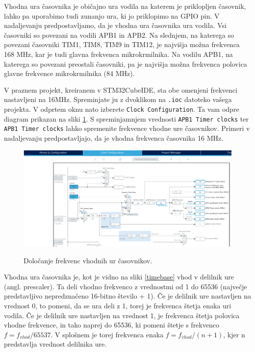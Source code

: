 \documentclass[12pt,letterpaper]{article}
\begin{document}
Vhodna ura časovnika je običajno ura vodila na katerem je priklopljen časovnik, lahko pa uporabimo tudi zunanjo ura, ki jo priklopimo na GPIO pin. V nadaljevanju predpostavljamo, da je vhodna ura časovnika ura vodila. Vsi časovniki so povezani na vodili APB1 in APB2. Na slednjem, na katerega so povezani časovniki TIM1, TIM8, TIM9 in TIM12, je najvišja možna frekvenca 168 MHz, kar je tudi glavna frekvenca mikrokrmilnika. Na vodilu APB1, na katerega so povezani preostali časovniki, pa je najvišja možna frekvenca polovica glavne frekvence mikrokrmilnika (84 MHz). 

V praznem projekt, kreiranem v STM32CubeIDE, sta obe omenjeni frekvenci nastavljeni na 16MHz. Spreminjate ju z dvoklikom na \texttt{.ioc} datoteko vašega projekta. V odprtem oknu nato izberete \texttt{Clock Configuration}. Ta vam odpre diagram prikazan na sliki \ref{timeconfig}. S spreminjamnjem vrednosti \texttt{APB1 Timer clocks} ter \texttt{APB1 Timer clocks} lahko spremenite frekvence vhodne ure časovnikov. Primeri v nadaljevanju predpostavljajo, da je vhodna frekvenca časovnika 16 MHz.

\begin{figure}[ht!]
  \centering
  \caption{Določanje frekvenc vhodnih ur časovnikov.}
  \includegraphics[width=380pt]{images/vaja7/clock_config.png}
  \label{timeconfig}
\end{figure}

Vhodna ura časovnika je, kot je vidno na sliki \ref{timebase} vhod v delilnik ure (angl. prescaler). Ta deli vhodno frekvenco z vrednostmi od 1 do 65536 (največje predstavljivo nepredznačeno 16-bitno število + 1). Če je delilnik ure nastavljen na vrednost 0, to pomeni, da se ura deli z 1, torej je frekvenca štetja enaka uri vodila. Če je delilnik ure nastavljen na vrednost 1, je frekvenca štetja polovica vhodne frekvence, in tako naprej do 65536, ki pomeni štetje s frekvenco $f = f_{vhod}/65537$. V splošnem je torej frekvenca enaka $f = f_{vhod}/(n + 1)$, kjer n predstavlja vrednost delilnika ure.
\end{document}
